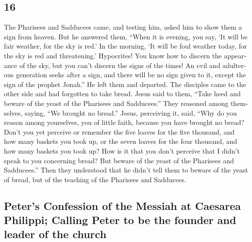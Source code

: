 \begin{paracol}{2}
\begin{otherlanguage}{english}
\hypertarget{section-31}{%
\section{16}\label{section-31}}

 The Pharisees and Sadducees came, and testing him, asked
him to show them a sign from heaven.  But he answered
them, ``When it is evening, you say, `It will be fair weather, for the
sky is red.'  In the morning, `It will be foul weather
today, for the sky is red and threatening.' Hypocrites! You know how to
discern the appearance of the sky, but you can't discern the signs of
the times!  An evil and adulterous generation seeks after
a sign, and there will be no sign given to it, except the sign of the
prophet Jonah.'' He left them and departed.  The disciples
came to the other side and had forgotten to take bread. 
Jesus said to them, ``Take heed and beware of the yeast of the Pharisees
and Sadducees.''  They reasoned among themselves, saying,
``We brought no bread.''  Jesus, perceiving it, said,
``Why do you reason among yourselves, you of little faith, because you
have brought no bread?  Don't you yet perceive or remember
the five loaves for the five thousand, and how many baskets you took up,
 or the seven loaves for the four thousand, and how many
baskets you took up?  How is it that you don't perceive
that I didn't speak to you concerning bread? But beware of the yeast of
the Pharisees and Sadducees.''  Then they understood that
he didn't tell them to beware of the yeast of bread, but of the teaching
of the Pharisees and Sadducees.

\hypertarget{peters-confession-of-the-messiah-at-caesarea-philippi-calling-peter-to-be-the-founder-and-leader-of-the-church}{%
\subsection{Peter's Confession of the Messiah at Caesarea Philippi;
Calling Peter to be the founder and leader of the
church}\label{peters-confession-of-the-messiah-at-caesarea-philippi-calling-peter-to-be-the-founder-and-leader-of-the-church}}


\end{otherlanguage}
\end{paracol}
